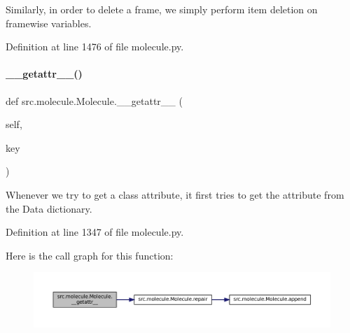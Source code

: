 Similarly, in order to delete a frame, we simply perform item deletion on framewise variables. 



Definition at line 1476 of file molecule.\+py.

\mbox{\label{classsrc_1_1molecule_1_1Molecule_afbb728fb44c4465e4f53b26a64439165}} 
\paragraph{\texorpdfstring{\+\_\+\+\_\+getattr\+\_\+\+\_\+()}{\_\_getattr\_\_()}}
{\footnotesize\ttfamily def src.\+molecule.\+Molecule.\+\_\+\+\_\+getattr\+\_\+\+\_\+ (\begin{DoxyParamCaption}\item[{}]{self,  }\item[{}]{key }\end{DoxyParamCaption})}



Whenever we try to get a class attribute, it first tries to get the attribute from the Data dictionary. 



Definition at line 1347 of file molecule.\+py.

Here is the call graph for this function\+:
\nopagebreak
\begin{figure}[H]
\begin{center}
\leavevmode
\includegraphics[width=350pt]{classsrc_1_1molecule_1_1Molecule_afbb728fb44c4465e4f53b26a64439165_cgraph}
\end{center}
\end{figure}
\mbox{\label{classsrc_1_1molecule_1_1Molecule_a30e057898525695364528d3b02c5762b}} 
